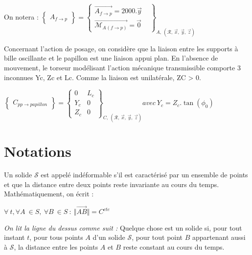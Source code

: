 \documentclass[
	11pt, %
	fleqn, %
	a4paper, %
]{LegrandOrangeBook}
\begin{document}
\begin{Extrait}
\begin{minipage}{0.4\textwidth}
\end{minipage}


On notera :
$\displaystyle \begin{Bmatrix}
A_{f\rightarrow p}
\end{Bmatrix} =\begin{Bmatrix}
\overrightarrow{A_{f\rightarrow p}} =2000.\vec{y} & \\
\overrightarrow{\mathcal{M}_{A}{}_{\left( f\rightarrow p\right)}} =\vec{0} & 
\end{Bmatrix}_{A,\ (\mathcal{R} ,\ \vec{x} ,\ \vec{y} ,\ \vec{z})}$

Concernant l’action de posage, on considère que la liaison entre les supports à bille
oscillante et le papillon est une liaison appui plan. En l’absence de mouvement, le
torseur modélisant l’action mécanique transmissible comporte 3 inconnues Yc, Zc et Lc.
Comme la liaison est unilatérale, ZC > 0.

$\displaystyle \begin{Bmatrix}
C_{pp\rightarrow papillon}
\end{Bmatrix} =\begin{Bmatrix}
0 & L_{c}\\
Y_{c} & 0\\
Z_{c} & 0
\end{Bmatrix}_{C,\ (\mathcal{R} ,\ \vec{x} ,\ \vec{y} ,\ \vec{z})} avec\ Y_{c} =Z_{c} .\tan( \phi_{0})$


\end{Extrait}




 
\section{Notations}

\begin{definition}
Un solide $\mathcal{S}$ est appelé indéformable s'il est caractérisé par un ensemble de points et que la distance entre deux points reste invariante au cours du temps. Mathématiquement, on écrit :


    $ \forall \ t,\forall A\ \in S,\ \forall B\ \in S\ :\ \Vert \overrightarrow{AB}\Vert =C^{cte} \ $ 


\textit{On lit la ligne du dessus comme suit :} Quelque chose est un solide si, pour tout instant $t$, pour tous points $A$ d'un solide $\mathcal{S}$, pour tout point $B$ appartenant aussi à $\mathcal{S}$, la distance entre les points $A$ et $B$ reste constant au cours du temps.
\end{definition}
\end{document}

